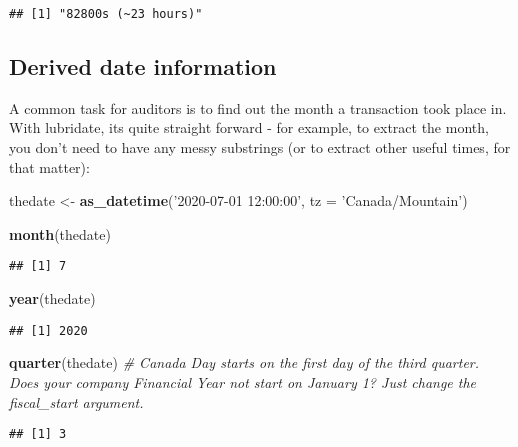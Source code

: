 \documentclass[
]{book}
\newenvironment{Shaded}{\begin{snugshade}}{\end{snugshade}}
\newcommand{\CommentTok}[1]{\textcolor[rgb]{0.56,0.35,0.01}{\textit{#1}}}
\newcommand{\DataTypeTok}[1]{\textcolor[rgb]{0.13,0.29,0.53}{#1}}
\newcommand{\KeywordTok}[1]{\textcolor[rgb]{0.13,0.29,0.53}{\textbf{#1}}}
\newcommand{\NormalTok}[1]{#1}
\newcommand{\StringTok}[1]{\textcolor[rgb]{0.31,0.60,0.02}{#1}}
\begin{document}
\begin{verbatim}
## [1] "82800s (~23 hours)"
\end{verbatim}

\hypertarget{derived-date-information}{%
\subsection{Derived date information}\label{derived-date-information}}

A common task for auditors is to find out the month a transaction took place in. With lubridate, its quite straight forward - for example, to extract the month, you don't need to have any messy substrings (or to extract other useful times, for that matter):

\begin{Shaded}
\begin{Highlighting}[]
\NormalTok{thedate <-}\StringTok{ }\KeywordTok{as_datetime}\NormalTok{(}\StringTok{'2020-07-01 12:00:00'}\NormalTok{, }\DataTypeTok{tz =} \StringTok{'Canada/Mountain'}\NormalTok{) }

\KeywordTok{month}\NormalTok{(thedate)}
\end{Highlighting}
\end{Shaded}

\begin{verbatim}
## [1] 7
\end{verbatim}

\begin{Shaded}
\begin{Highlighting}[]
\KeywordTok{year}\NormalTok{(thedate)}
\end{Highlighting}
\end{Shaded}

\begin{verbatim}
## [1] 2020
\end{verbatim}

\begin{Shaded}
\begin{Highlighting}[]
\KeywordTok{quarter}\NormalTok{(thedate) }\CommentTok{# Canada Day starts on the first day of the third quarter. Does your company Financial Year not start on January 1? Just change the fiscal_start argument.}
\end{Highlighting}
\end{Shaded}

\begin{verbatim}
## [1] 3
\end{verbatim}
\end{document}
